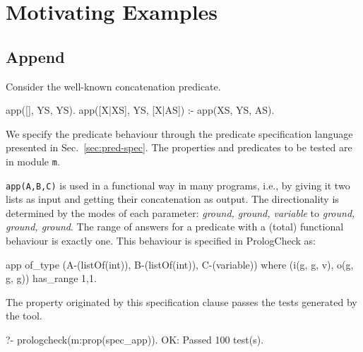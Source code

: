 \documentclass[runningheads,a4paper]{llncs}
\newcommand{\yap}[1]{\lstinline[style=yap]{#1}}
\newcommand{\refSec}[1]{Sec.~\ref{#1}}
\newcommand{\plqc}[0]{{\sf PrologCheck}}
\begin{document}


\section{Motivating Examples}
\label{sec:motiv-ex}


\subsection{Append}
Consider the well-known concatenation predicate.
%
\begin{yapcode}
 app([], YS, YS).
 app([X|XS], YS, [X|AS]) :- app(XS, YS, AS).
\end{yapcode}
%
We specify the predicate behaviour through the predicate
specification language presented in \refSec{sec:pred-spec}.
%
The properties and predicates to be tested are in module \yap{m}.
%



\yap{app(A,B,C)} is used in a functional way in many programs,
i.e., by giving it two lists as input and getting their concatenation as
output.
%
The directionality is determined by the modes of each
parameter: \emph{ground, ground, variable} to \emph{ground, ground, ground}.
%
The range of answers for a predicate with a (total) functional
behaviour is exactly one.
%
This behaviour is specified in \plqc{} as:
\begin{yapcode}
 app of_type (A-(listOf(int)), B-(listOf(int)), C-(variable))
   where (i(g, g, v), o(g, g, g))  has_range {1,1}.
\end{yapcode}
%
The property originated by this specification clause passes the tests
generated by the tool.
%
\begin{yapcode}
   ?- prologcheck(m:prop(spec_app)).
 OK: Passed 100 test(s).
\end{yapcode}
\end{document}
